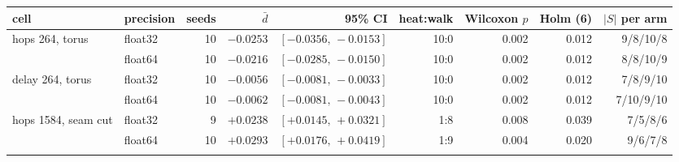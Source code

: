 \begin{tabular}{@{}llrrrrrrr@{}}
\toprule
cell & precision & seeds & $\bar d$ & 95\% CI & heat:walk & Wilcoxon $p$ & Holm (6) & $|S|$ per arm \\
\midrule
hops 264, torus & float32 & 10 & $-0.0253$ & $[-0.0356,\,-0.0153]$ & 10:0 & 0.002 & 0.012 & 9/8/10/8 \\
& float64 & 10 & $-0.0216$ & $[-0.0285,\,-0.0150]$ & 10:0 & 0.002 & 0.012 & 8/8/10/9 \\
\addlinespace[2pt]
delay 264, torus & float32 & 10 & $-0.0056$ & $[-0.0081,\,-0.0033]$ & 10:0 & 0.002 & 0.012 & 7/8/9/10 \\
& float64 & 10 & $-0.0062$ & $[-0.0081,\,-0.0043]$ & 10:0 & 0.002 & 0.012 & 7/10/9/10 \\
\addlinespace[2pt]
hops 1584, seam cut & float32 & 9 & $+0.0238$ & $[+0.0145,\,+0.0321]$ & 1:8 & 0.008 & 0.039 & 7/5/8/6 \\
& float64 & 10 & $+0.0293$ & $[+0.0176,\,+0.0419]$ & 1:9 & 0.004 & 0.020 & 9/6/7/8 \\
\addlinespace[2pt]
\bottomrule
\end{tabular}
